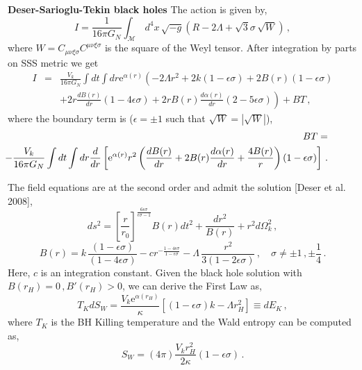\documentclass[ignorenonframetext,slidestop,compress]{beamer}
\begin{document}
\begin{frame}
{\bf Deser-Sarioglu-Tekin black holes}
The action is given by,
\begin{equation*}
I = \frac{1}{16\pi G_N} \int_{\mathcal M}\,d^4x\,\sqrt{-g} 
\left(R -2\Lambda + \sqrt{3}\sigma\,\sqrt{W}\right) \,,
\end{equation*}
where $W=C_{\mu\nu\xi\sigma}C^{\mu\nu\xi\sigma}$ is the square of the Weyl tensor. After integration by parts on SSS metric we get
\begin{eqnarray*}
 I&=&\frac{V_k}{16\pi G_N}\int dt\int dr
 \text{e}^{\alpha(r)}\left(
 -2\Lambda r^2+2k(1-\epsilon\sigma)+
 2B(r)(1-\epsilon\sigma)
 \right.\nonumber\\&&\left.+
 2r \frac{d B(r)}{d r}(1-4\epsilon\sigma)
 +2rB(r)\frac{d\alpha(r)}{d r}(2-5\epsilon\sigma)
 \right)+BT\,,
\end{eqnarray*}
where the boundary term is ($\epsilon=\pm 1$ such that $\sqrt{W}=|\sqrt{W}|$),
\begin{eqnarray*}
&&BT=\nonumber\\
&&
\hspace{-1.5cm}-\frac{V_k}{16\pi G_N}\int dt\int dr\frac{d}{dr}\left[
\text{e}^{\alpha(r)}r^2\left(\frac{d B(r)}{d r}+2B(r)\frac{d\alpha(r)}{d r}+\frac{4B(r)}{r}\right)\left(
1-\epsilon\sigma
\right)
\right]\,.
\end{eqnarray*}
\end{frame}
 
 \begin{frame}
The field equations are at the second order and admit the solution [Deser et al. 2008],
\begin{equation*}
ds^2=\left[\frac{r}{r_0}\right]^{\frac{6\epsilon\sigma}{\epsilon\sigma-1}}B(r)dt^2+\frac{dr^2}{B(r)}+r^2d\Omega^2_k\,,
\end{equation*}
\begin{equation*}
B(r)= k\,\frac{(1-\epsilon\sigma)}{(1-4\epsilon\sigma)} - c r^{-\frac{1-4\epsilon\sigma}{1-\epsilon\sigma}}
 -\Lambda\,\frac{r^2}{3(1-2\epsilon\sigma)}\,,\quad\sigma\neq \pm1\,,\pm\frac{1}{4}\,.
\end{equation*}
Here, $c$ is an integration constant. Given the black hole solution with $B(r_H)=0\,, B'(r_H)>0$, we can derive the First Law as,
\begin{equation*}
T_K d S_W=\frac{V_k\text{e}^{\alpha(r_H)}}{\kappa}\left[
(1-\epsilon\sigma)k-\Lambda r_H^2\right]\equiv d E_K\,,
\end{equation*}
where $T_K$ is the BH Killing temperature and the Wald entropy can be computed as,
\begin{equation*}
 S_W=(4\pi )\frac{V_k r_H^2}{2\kappa}\left(1-\epsilon\sigma\right)\,.
 \end{equation*}
 \end{frame}
\end{document}
